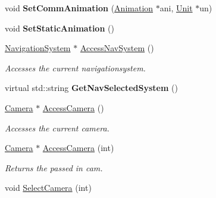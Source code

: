 \begin{DoxyCompactItemize}
\item 
void {\bfseries Set\+Comm\+Animation} (\hyperlink{classAnimation}{Animation} $\ast$ani, \hyperlink{classUnit}{Unit} $\ast$un)\hypertarget{classGameCockpit_a397776a478eb3fe7755b0236396e313c}{}\label{classGameCockpit_a397776a478eb3fe7755b0236396e313c}

\item 
void {\bfseries Set\+Static\+Animation} ()\hypertarget{classGameCockpit_a503a76cdb764a3e332764ed373cb2ad6}{}\label{classGameCockpit_a503a76cdb764a3e332764ed373cb2ad6}

\item 
\hyperlink{classNavigationSystem}{Navigation\+System} $\ast$ \hyperlink{classGameCockpit_a839c83cf45c2e81fd0e7268111f72ee3}{Access\+Nav\+System} ()\hypertarget{classGameCockpit_a839c83cf45c2e81fd0e7268111f72ee3}{}\label{classGameCockpit_a839c83cf45c2e81fd0e7268111f72ee3}

\begin{DoxyCompactList}\small\item\em Accesses the current navigationsystem. \end{DoxyCompactList}\item 
virtual std\+::string {\bfseries Get\+Nav\+Selected\+System} ()\hypertarget{classGameCockpit_a3935c2f78ad115d3341146ed187072d7}{}\label{classGameCockpit_a3935c2f78ad115d3341146ed187072d7}

\item 
\hyperlink{classCamera}{Camera} $\ast$ \hyperlink{classGameCockpit_ae7f1671e3a0a16a9f95c7f731723b780}{Access\+Camera} ()\hypertarget{classGameCockpit_ae7f1671e3a0a16a9f95c7f731723b780}{}\label{classGameCockpit_ae7f1671e3a0a16a9f95c7f731723b780}

\begin{DoxyCompactList}\small\item\em Accesses the current camera. \end{DoxyCompactList}\item 
\hyperlink{classCamera}{Camera} $\ast$ \hyperlink{classGameCockpit_aa75767422e3572f0c7e63491fc2a9d60}{Access\+Camera} (int)\hypertarget{classGameCockpit_aa75767422e3572f0c7e63491fc2a9d60}{}\label{classGameCockpit_aa75767422e3572f0c7e63491fc2a9d60}

\begin{DoxyCompactList}\small\item\em Returns the passed in cam. \end{DoxyCompactList}\item 
void \hyperlink{classGameCockpit_a2b15c1cba09cd14e9642c2282b970274}{Select\+Camera} (int)\hypertarget{classGameCockpit_a2b15c1cba09cd14e9642c2282b970274}{}\label{classGameCockpit_a2b15c1cba09cd14e9642c2282b970274}


\end{DoxyCompactItemize}
